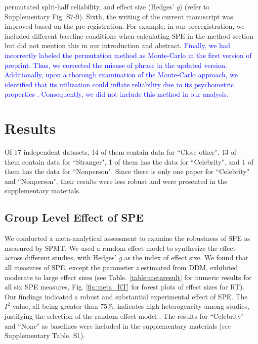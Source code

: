 \documentclass[sn-apa]{sn-jnl}%
\theoremstyle{thmstyleone}%
\theoremstyle{thmstyletwo}%
\theoremstyle{thmstylethree}%
\begin{document}
permutated split-half reliability, and effect size (Hedges’ \textit{g}) (refer to Supplementary Fig. S7-9). Sixth, the writing of the current manuscript was improved based on the pre-registration. For example, in our preregistration, we included different baseline conditions when calculating SPE in the method section but did not mention this in our introduction and abstract. \textcolor{blue}{Finally, we had incorrectly labeled the permutation method as Monte-Carlo in the first version of preprint. Thus, we corrected the misuse of phrase in the updated version. Additionally, upon a thorough examination of the Monte-Carlo approach, we identified that its utilization could  inflate reliability due to its psychometric properties \parencite{kahveci2022reliability}. Consequently, we did not include this method in our analysis.} 

\section{Results}\label{sec4}

Of 17 independent datasets, 14 of them contain data for ``Close other", 13 of them contain data for ``Stranger", 1 of them has the data for ``Celebrity", and 1 of them has the data for ``Nonperson". Since there is only one paper for ``Celebrity" and ``Nonperson", their results were less robust and were presented in the supplementary materials.

\subsection{Group Level Effect of SPE}\label{subsec:groupeff}

We conducted a meta-analytical assessment to examine the robustness of SPE as measured by SPMT. We used a random effect model to synthesize the effect across different studies, with Hedges’ \textit{g} as the index of effect size. We found that all measures of SPE, except the parameter \textit{z} estimated from DDM, exhibited moderate to large effect sizes (see Table. \ref{table:metaresult} for numeric results for all six SPE measures, Fig. \ref{fig:meta_RT} for forest plots of effect sizes for RT). Our findings indicated a robust and substantial experimental effect of SPE. The $I^{2}$ value, all being greater than 75\%, indicates high heterogeneity among studies, justifying the selection of the random effect model \parencite{borenstein2021introduction}.  The results for ``Celebrity" and ``None" as baselines were included in the supplementary materials (see Supplementary Table. S1). 
\end{document}
